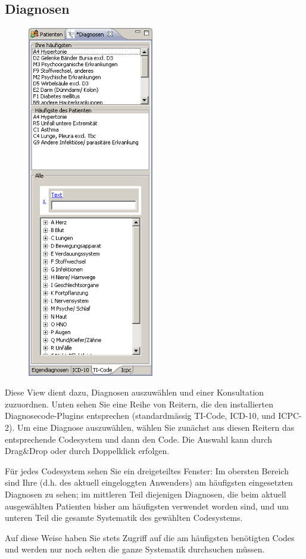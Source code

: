 \subsection{Diagnosen}
\label{view:diagnosen} 
\begin{figure}
    \includegraphics[width=5.5cm]{images/diagnosenview}
    \label{fig:diagnosen}
\end{figure}
Diese View dient dazu, Diagnosen auszuwählen und einer Konsultation zuzuordnen. Unten sehen Sie eine Reihe von Reitern, die den installierten Diagnosecode-Plugins entsprechen (standardmässig TI-Code, ICD-10, und ICPC-2). Um eine Diagnose auszuwählen, wählen Sie zunächst aus diesen Reitern das entsprechende Codesystem und dann den Code. Die Auswahl kann durch Drag\&Drop oder durch Doppelklick erfolgen.

Für jedes Codesystem sehen Sie ein dreigeteiltes Fenster: Im obersten Bereich sind Ihre (d.h. des aktuell eingeloggten Anwenders) am häufigsten eingesetzten Diagnosen zu sehen; im mittleren Teil diejenigen Diagnosen, die beim aktuell ausgewählten Patienten bisher am häufigsten verwendet worden sind, und um unteren Teil die gesamte Systematik des gewählten Codesystems.

\medskip

Auf diese Weise haben Sie stets Zugriff auf die am häufigsten benötigten Codes und werden nur noch selten die ganze Systematik durchsuchen müssen.

